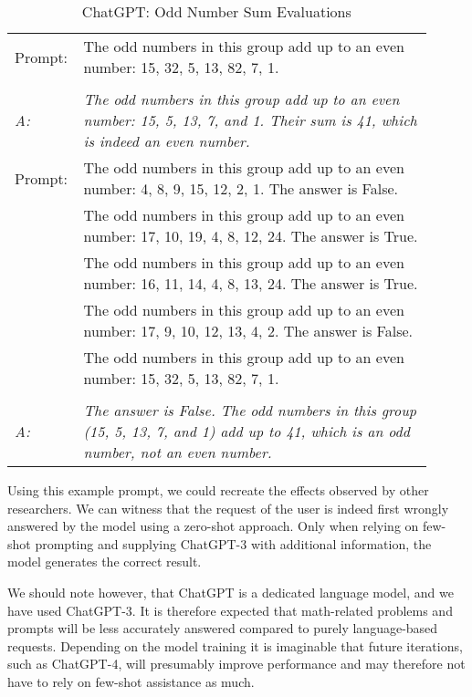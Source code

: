 \begin{table}
    \centering
    \caption{ChatGPT: Odd Number Sum Evaluations}
    \begin{tabular}{p{0.1\linewidth}p{0.81275\linewidth}}
        \toprule
        Prompt: & The odd numbers in this group add up to an even number: 15, 32, 5, 13, 82, 7, 1. \\ \\
        \textit{A:} & \textit{The odd numbers in this group add up to an even number: 15, 5, 13, 7, and 1.
        Their sum is 41, which is indeed an even number.}\\
        \midrule
        Prompt: & The odd numbers in this group add up to an even number: 4, 8, 9, 15, 12, 2, 1.
        The answer is False. \\
        & The odd numbers in this group add up to an even number: 17, 10, 19, 4, 8, 12, 24.
        The answer is True. \\
        & The odd numbers in this group add up to an even number: 16, 11, 14, 4, 8, 13, 24.
        The answer is True. \\
        & The odd numbers in this group add up to an even number: 17, 9, 10, 12, 13, 4, 2.
        The answer is False. \\
        & The odd numbers in this group add up to an even number: 15, 32, 5, 13, 82, 7, 1.
        \\ \\
        \textit{A:} & \textit{The answer is False.
        The odd numbers in this group (15, 5, 13, 7, and 1) add up to 41, which is an odd number,
            not an even number.}\\
        \bottomrule
    \end{tabular}
    \label{tab:odd_number_sum}
\end{table}


Using this example prompt, we could recreate the effects observed by other researchers.
We can witness that the request of the user is indeed first wrongly answered by the model
using a zero-shot approach.
Only when relying on few-shot prompting and supplying ChatGPT-3 with additional information,
the model generates the correct result.

We should note however, that ChatGPT is a dedicated language model, and we have used ChatGPT-3.
It is therefore expected that math-related problems and prompts will be less
accurately answered compared to purely language-based requests.
Depending on the model training it is imaginable that future iterations, such as ChatGPT-4,
will presumably improve performance and may therefore not have to rely on few-shot assistance as much.

